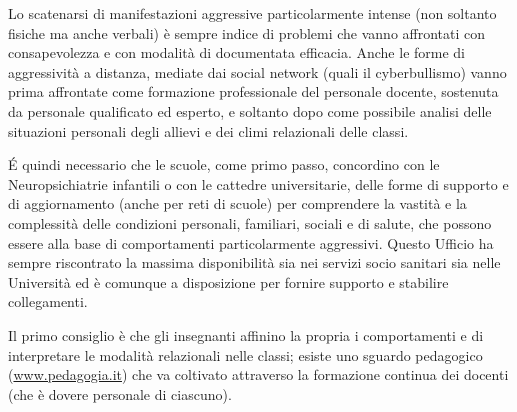 \begin{description}
\begin{enumerate}
\begin{description}
 		Lo scatenarsi di manifestazioni aggressive particolarmente intense (non soltanto fisiche ma anche
 		verbali) è sempre indice di problemi che vanno affrontati con consapevolezza e con modalità di
 		documentata efficacia. Anche le forme di aggressività a distanza, mediate dai social network (quali il
 		cyberbullismo) vanno prima affrontate come formazione professionale del personale docente,
 		sostenuta da personale qualificato ed esperto, e soltanto dopo come possibile analisi delle situazioni
 		personali degli allievi e dei climi relazionali delle classi.
 		
 		\'{E} quindi necessario che le scuole, come primo passo, concordino con le Neuropsichiatrie infantili o
 		con le cattedre universitarie, delle forme di supporto e di aggiornamento (anche per reti di scuole) per
 		comprendere la vastità e la complessità delle condizioni personali, familiari, sociali e di salute, che
 		possono essere alla base di comportamenti particolarmente aggressivi. Questo Ufficio ha sempre
 		riscontrato la massima disponibilità sia nei servizi socio sanitari sia nelle Università ed è comunque a
 		disposizione per fornire supporto e stabilire collegamenti.
 		
 		Il primo consiglio è che gli insegnanti affinino la propria  i comportamenti e di
 		interpretare le modalità relazionali nelle classi; esiste uno sguardo pedagogico  (\url{www.pedagogia.it}) che va coltivato attraverso la formazione
 		continua dei docenti (che è dovere personale di ciascuno).
 		

\end{description}
\end{enumerate}
\end{description}
